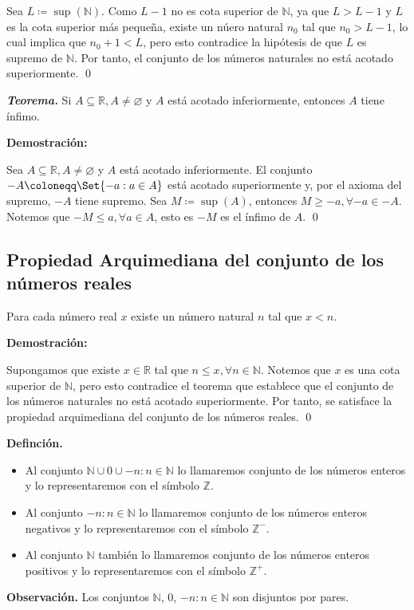 \documentclass[11pt]{article}
\newcommand{\N}{\mathbb{N}}
\newcommand{\Z}{\mathbb{Z}}
\newcommand{\R}{\mathbb{R}}
\let\emptyset\varnothing
\let\set\Set
\begin{document}
Sea $L\coloneqq \sup{(\N)}$. Como $L-1$ no es cota superior de $\N$, ya que $L>L-1$ y $L$ es la cota superior más pequeña, existe un núero natural $n_0$ tal que $n_0>L-1$, lo cual implica que $n_0+1<L$, pero esto contradice la hipótesis	de que $L$ es supremo de $\N$. Por tanto, el conjunto de los números naturales no está acotado superiormente. \qed

\textbf{\textit{Teorema.}} Si $A\subseteq \R, A\neq \emptyset$ y $A$ está acotado inferiormente, entonces $A$ tiene ínfimo.

\textbf{Demostración:}

Sea $A\subseteq \R, A\neq \emptyset$ y $A$ está acotado inferiormente. El conjunto $-A \coloneqq \set{-a: a\in A}$ está acotado superiormente y, por el axioma del supremo, $-A$ tiene supremo. Sea $M\coloneqq \sup{(A)}$, entonces $M\geq -a, \forall -a\in -A$. Notemos que $-M\leq a, \forall a\in A$, esto es $-M$ es el ínfimo de $A$. \qed

\subsection*{Propiedad Arquimediana del conjunto de los números reales}

Para cada número real $x$ existe un número natural $n$ tal que $x<n$.

\textbf{Demostración:}

Supongamos que existe $x\in \R$ tal que $n\leq x, \forall n\in \N$. Notemos que $x$ es una cota superior de $\N$, pero esto contradice el teorema que establece que el conjunto de los números naturales no está acotado superiormente. Por tanto, se satisface la propiedad arquimediana del conjunto de los números reales. \qed

\textbf{Definción.} \begin{itemize}
    \item Al conjunto $\N \cup {0} \cup {-n: n\in \N}$ lo llamaremos conjunto de los números enteros y lo representaremos con el símbolo $\Z$.
    \item Al conjunto ${-n: n\in \N}$ lo llamaremos conjunto de los números enteros negativos y lo representaremos con el símbolo $\Z^-$.
    \item Al conjunto $\N$ también lo llamaremos conjunto de los números enteros positivos y lo representaremos con el símbolo $\Z^+$.
\end{itemize}

\textbf{Observación.} Los conjuntos $\N$, ${0}$, ${-n: n\in \N}$ son disjuntos por pares.
\end{document}
